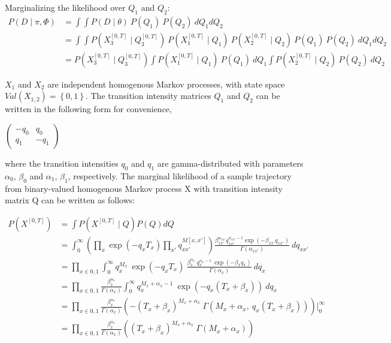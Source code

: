 Marginalizing the likelihood over $ Q_{1} $ and $ Q_{2} $:
\begin{align}
P(\textit{D} \mid \pi, \Phi ) & = 	\int \int P(\textit{D} \mid \theta ) \ P(Q_{1}) \ P(Q_{2}) \ dQ_{1}dQ_{2} \\ & = \int \int P(X_{3}^{[0, T]}\mid Q_{3}^{[0, T]}) \ P(X_{1}^{[0, T]}\mid Q_{1}) \ P(X_{2}^{[0, T]}\mid Q_{2}) \ P(Q_{1}) \ P(Q_{2})\ dQ_{1}dQ_{2} \\ & = P(X_{3}^{[0, T]}\mid Q_{3}^{[0, T]}) \int  P(X_{1}^{[0, T]}\mid Q_{1}) \ P(Q_{1}) \ dQ_{1} \int P(X_{2}^{[0, T]}\mid Q_{2})\ P(Q_{2})\ dQ_{2}
\label{eq:Marg_llh}
\end{align}

$ X_{1} $ and $ X_{2} $ are independent homogenous Markov processes, with state space $ Val(X_{1, 2}) = \left\lbrace 0, 1 \right\rbrace $. The transition intensity matrices $ Q_{1} $ and $ Q_{2} $ can be written in the following form for convenience,
\begin{center}
	\begin{math}
	\begin{pmatrix}
	-q_{0} & q_{0} \\
	q_{1} & -q_{1}
	\end{pmatrix}
	\end{math}\\
\end{center}
where the transition intensities $ q_{0} $ and $ q_{1} $ are gamma-distributed with parameters $ \alpha_{0}$, $ \beta_{0} $ and $ \alpha_{1} $, $ \beta_{1} $, respectively. The marginal likelihood of a sample trajectory from binary-valued homogenous Markov process X with transition intensity matrix Q can be written as follows:

\begin{align}
P(X^{[0, T]}) & = \int  P(X^{[0, T]}\mid Q)P(Q) dQ \\ & = \int_{0}^{\infty} \left( \prod_{x} \exp(-q_{x}T_{x}) \prod_{x'} q_{xx'}^{M[x, x']}\right) \frac{\beta_{xx'}^{\alpha_{xx'}}{q_{xx'}^{\alpha_{xx'}-1}}\exp(-\beta_{xx'}q_{xx'})}{\Gamma(\alpha_{xx'})} \ dq_{xx'} \\ & = \prod_{x\in{0,1}}\int_{0}^{\infty} q_{x}^{M_{x}} \ \exp(-q_{x}T_{x}) \  \frac{\beta_{x}^{\alpha_{x}} \ q_{x}^{\alpha_{x}-1}\ \exp(-\beta_{x}q_{x})}{\Gamma(\alpha_{x})} \ dq_{x} \\ & = \prod_{x\in{0,1}} \frac{\beta_{x}^{\alpha_{x}}}{\Gamma(\alpha_{x})} \int_{0}^{\infty} q_{x}^{M_{x} + \alpha_{x} -1} \ \exp(-q_{x}(T_{x}+\beta_{x})) \ dq_{x} \\ & = \prod_{x\in{0,1}} \frac{\beta_{x}^{\alpha_{x}}}{\Gamma(\alpha_{x})} \left( -(T_{x}+\beta_{x})^{M_{x} + \alpha_{x}}\ \Gamma(M_{x} + \alpha_{x}, \ q_{x}(T_{x}+\beta_{x})) \right) \Big|_0^\infty  \\ & = \prod_{x\in{0,1}} \frac{\beta_{x}^{\alpha_{x}}}{\Gamma(\alpha_{x})} \left( (T_{x}+\beta_{x})^{M_{x} + \alpha_{x}}\ \Gamma(M_{x} + \alpha_{x}) \right)
\label{eq:Marg_traj}
\end{align}

